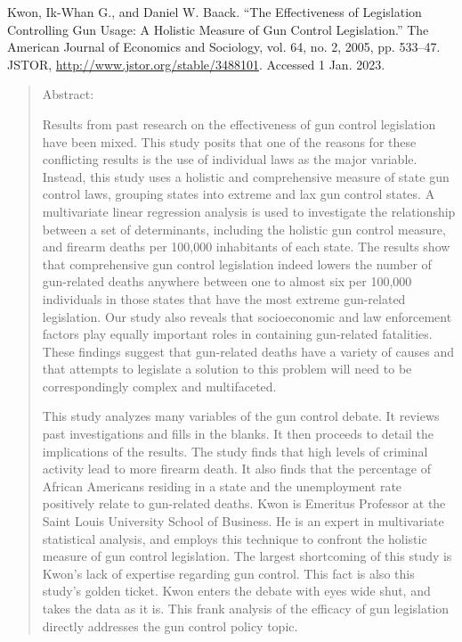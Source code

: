 \documentclass [12pt]{article}
\newcommand{\bibent}{\noindent \hangindent 40pt}
\newcommand{\bibannote}{\begin{quotation}}
\newcommand{\bibendote}{\end{quotation}}
\begin{document}
\bibent Kwon, Ik-Whan G., and Daniel W. Baack. “The Effectiveness of Legislation Controlling Gun Usage: A Holistic Measure of Gun Control Legislation.” The American Journal of Economics and Sociology, vol. 64, no. 2, 2005, pp. 533–47. JSTOR, \url{http://www.jstor.org/stable/3488101}. Accessed 1 Jan. 2023.
\bibannote
Abstract: \par Results from past research on the effectiveness of gun control legislation have been mixed. This study posits that one of the reasons for these conflicting results is the use of individual laws as the major variable. Instead, this study uses a holistic and comprehensive measure of state gun control laws, grouping states into extreme and lax gun control states. A multivariate linear regression analysis is used to investigate the relationship between a set of determinants, including the holistic gun control measure, and firearm deaths per 100,000 inhabitants of each state. The results show that comprehensive gun control legislation indeed lowers the number of gun-related deaths anywhere between one to almost six per 100,000 individuals in those states that have the most extreme gun-related legislation. Our study also reveals that socioeconomic and law enforcement factors play equally important roles in containing gun-related fatalities. These findings suggest that gun-related deaths have a variety of causes and that attempts to legislate a solution to this problem will need to be correspondingly complex and multifaceted. \par
This study analyzes many variables of the gun control debate. It reviews past investigations and fills in the blanks. It then proceeds to detail the implications of the results. The study finds that high levels of criminal activity lead to more firearm death. It also finds that the percentage of African Americans residing in a state and the unemployment rate positively relate to gun-related deaths. Kwon is Emeritus Professor at the Saint Louis University School of Business. He is an expert in multivariate statistical analysis, and employs this technique to confront the holistic measure of gun control legislation. The largest shortcoming of this study is Kwon's lack of expertise regarding gun control. This fact is also this study's golden ticket. Kwon enters the debate with eyes wide shut, and takes the data as it is. This frank analysis of the efficacy of gun legislation directly addresses the gun control policy topic.
\bibendote
\end{document}
